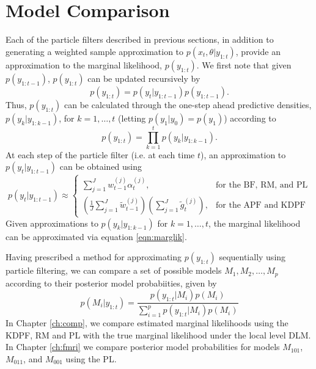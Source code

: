 \section{Model Comparison \label{sec:comp}}

Each of the particle filters described in previous sections, in addition to generating a weighted sample approximation to $p(x_t,\theta|y_{1:t})$, provide an approximation to the marginal likelihood, $p(y_{1:t})$. We first note that given $p(y_{1:t-1})$, $p(y_{1:t})$ can be updated recursively by
\begin{equation}
p(y_{1:t}) = p(y_t|y_{1:t-1})p(y_{1:t-1}). \label{eqn:marglik:recurse}
\end{equation}
Thus, $p(y_{1:t})$ can be calculated through the one-step ahead predictive densities, $p(y_k|y_{1:k-1})$, for $k=1,\ldots,t$ (letting $p(y_1|y_0) = p(y_1)$) according to
\begin{equation}
p(y_{1:t}) = \prod_{k=1}^t p(y_k|y_{1:k-1}). \label{eqn:marglik}
\end{equation}
At each step of the particle filter (i.e. at each time $t$), an approximation to $p(y_t|y_{1:t-1})$ can be obtained using
\begin{equation}
p(y_t|y_{1:t-1}) \approx \left\{\begin{array}{ll} \sum_{j=1}^J w^{(j)}_{t-1}\alpha^{(j)}_t, & \mbox{for the BF, RM, and PL} \\ \left(\frac{1}{J}\sum_{j=1}^J \tilde{w}^{(j)}_{t-1}\right)\left(\sum_{j=1}^J\tilde{g}^{(j)}_t\right), & \mbox{for the APF and KDPF} \end{array} \right.\label{eqn:onestep:pf}
\end{equation}
Given approximations to $p(y_k|y_{1:k-1})$ for $k = 1,\ldots,t$, the marginal likelihood can be approximated via equation \eqref{eqn:marglik}.

Having prescribed a method for approximating $p(y_{1:t})$ sequentially using particle filtering, we can compare a set of possible models ${M_1,M_2,\ldots,M_p}$ according to their posterior model probabiities, given by
\begin{equation}
p(M_i|y_{1:t}) = \frac{p(y_{1:t}|M_i)p(M_i)}{\sum_{i=1}^p p(y_{1:t}|M_i)p(M_i)} \label{eqn:modelcomp}
\end{equation}
In Chapter \ref{ch:comp}, we compare estimated marginal likelihoods using the KDPF, RM and PL with the true marginal likelihood under the local level DLM. In Chapter \ref{ch:fmri} we compare posterior model probabilities for models $M_{101}$, $M_{011}$, and $M_{001}$ using the PL.

